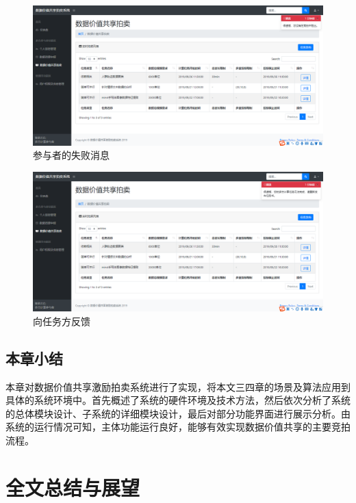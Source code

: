 \documentclass[promaster]{thesis-uestc}
\begin{document}
\begin{figure}[H]
    \includegraphics[width=400pt]{ui/xinzengshibai.png}
    \caption{参与者的失败消息}
    \label{xinzengshibai}
\end{figure}

\begin{figure}[H]
    \includegraphics[width=400pt]{ui/xinzengrenwushibai.png}
    \caption{向任务方反馈}
    \label{xinzengrenwushibai}
\end{figure}

\FloatBarrier

\section{本章小结}
本章对数据价值共享激励拍卖系统进行了实现，将本文三四章的场景及算法应用到具体的系统环境中。首先概述了系统的硬件环境及技术方法，然后依次分析了系统的总体模块设计、子系统的详细模块设计，最后对部分功能界面进行展示分析。由系统的运行情况可知，主体功能运行良好，能够有效实现数据价值共享的主要竞拍流程。

\chapter{全文总结与展望}
\end{document}
